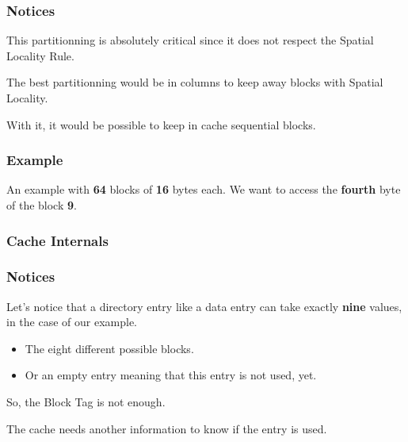 \begin{frame}
  \frametitle{Notices}

  This partitionning is absolutely critical since it does not respect
  the Spatial Locality Rule.

  \-

  The best partitionning would be in columns to keep away blocks with
  Spatial Locality.

  \-

  With it, it would be possible to keep in cache sequential blocks.
\end{frame}


\begin{frame}
  \frametitle{Example}

  An example with \textbf{64} blocks of \textbf{16} bytes each. We want
  to access the \textbf{fourth} byte of the block \textbf{9}.

  \begin{center}
  \end{center}
\end{frame}


\begin{frame}
  \frametitle{Cache Internals}

  \begin{center}
  \end{center}
\end{frame}


\begin{frame}
  \frametitle{Notices}

  Let's notice that a directory entry like a data entry can take exactly
  \textbf{nine} values, in the case of our example.

  \begin{itemize}[<+->]
    \item
      The eight different possible blocks.
    \item
      Or an empty entry meaning that this entry is not used, yet.
  \end{itemize}

  So, the Block Tag is not enough.

  \-

  The cache needs another information to know if the entry is used.
\end{frame}

